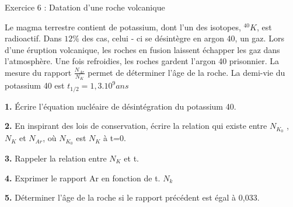 \documentclass[12pt, french]{article}
\begin{document}
\begin{Box2}{Exercice 6 : Datation d’une roche volcanique }

	Le magma terrestre contient de potassium, dont l’un des isotopes, $^{40}K$, est radioactif. Dans $12\%$
des cas, celui - ci se désintègre en argon 40, un gaz. Lors d’une éruption volcanique, les roches en
fusion laissent échapper les gaz dans l’atmosphère. Une fois refroidies, les roches gardent l’argon 40
prisonnier. La mesure du rapport $\frac{N_{Ar}}{N_{K}}$ permet de déterminer l’âge de la roche. La demi-vie du potassium 40 est $t_{1/2} = 1,3.10^9ans$

\textbf{1. }Écrire l’équation nucléaire de désintégration du potassium 40.

\textbf{2. }En inspirant des lois de conservation, écrire la relation qui existe entre $N_{K_0}$ , $N_K$ et $N_{Ar}$, où $N_{K_0}$ est $N_K$ à t=0.

\textbf{3. } Rappeler la relation entre $N_K$ et t.

\textbf{4.} Exprimer le rapport Ar en fonction de t. $N_k$

\textbf{5.} Déterminer l’âge de la roche si le rapport précédent est égal à 0,033.

\end{Box2}
\end{document}
